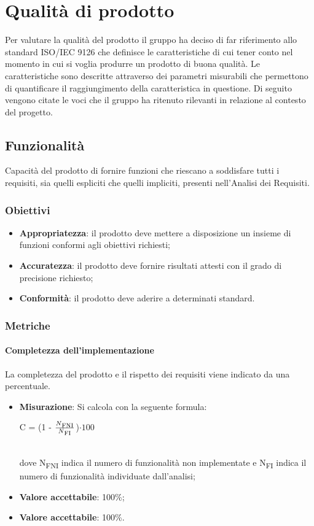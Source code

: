 \section{Qualità di prodotto}
Per valutare la qualità del prodotto il gruppo ha deciso di far riferimento allo standard ISO/IEC 9126\glosp{} che definisce le caratteristiche di cui tener conto nel momento in cui si voglia produrre un prodotto di buona qualità. Le caratteristiche sono descritte attraverso dei parametri misurabili che permettono di quantificare il raggiungimento della caratteristica in questione. Di seguito vengono citate le voci che il gruppo ha ritenuto rilevanti in relazione al contesto del progetto.
	\subsection{Funzionalità}
	Capacità del prodotto di fornire funzioni che riescano a soddisfare tutti i requisiti, sia quelli espliciti che quelli impliciti, presenti nell'Analisi dei Requisiti.
		\subsubsection{Obiettivi}
		\begin{itemize}
			\item \textbf{Appropriatezza}: il prodotto deve mettere a disposizione un insieme di funzioni conformi agli obiettivi richiesti;
			\item \textbf{Accuratezza}: il prodotto deve fornire risultati attesti con il grado di precisione richiesto;
			\item \textbf{Conformità}: il prodotto deve aderire a determinati standard. %
		\end{itemize}
		\subsubsection{Metriche}
			\paragraph{Completezza dell'implementazione}
			La completezza del prodotto e il rispetto dei requisiti viene indicato da una percentuale.
			\begin{itemize}
			\item \textbf{Misurazione}: Si calcola con la seguente formula: \\
			\centerline { C = (1 - \(\frac{N\textsubscript{FNI}}{N\textsubscript{FI}} \))$ \cdot  100$ } \\
			dove N\textsubscript{FNI} indica il numero di funzionalità non implementate e N\textsubscript{FI} indica il numero di funzionalità individuate dall'analisi;
			\item \textbf{Valore accettabile}: 100\%;
			\item \textbf{Valore accettabile}: 100\%.
			\end{itemize}
